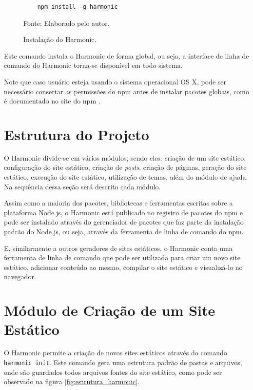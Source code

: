 \documentclass[ppginf, pep]{esinucpel}
\newcommand{\code}[1]{\texttt{#1}}
\begin{document}
\begin{figure}[H]
    \centering
    \caption{Instalação do Harmonic.}
    \vspace{5pt}
    \lstset{language=sh}
    \begin{lstlisting}
    npm install -g harmonic
    \end{lstlisting}
    Fonte: Elaborado pelo autor.
    \label{fig:install_harmonic}
\end{figure}

Este comando instala o Harmonic de forma global, ou seja, a interface de linha de comando do Harmonic torna-se disponível em todo sistema.

Note que caso usuário esteja usando o sistema operacional OS X, pode ser necessário consertar as permissões do npm antes de instalar pacotes globais, como é documentado no site do npm \cite{npm_fix_perms}.

\section{Estrutura do Projeto}

O Harmonic divide-se em vários módulos, sendo eles: criação de um site estático, configuração do site estático, criação de \textit{posts}, criação de páginas, geração do site estático, execução do site estático, utilização de temas, além do módulo de ajuda. Na sequência dessa seção será descrito cada módulo.

Assim como a maioria dos pacotes, bibliotecas e ferramentas escritas sobre a plataforma Node.js, o Harmonic está publicado no registro de pacotes do npm e pode ser instalado através do gerenciador de pacotes que faz parte da instalação padrão do Node.js, ou seja, através da ferramenta de linha de comando do npm.

E, similarmente a outros geradores de sites estáticos, o Harmonic conta uma ferramenta de linha de comando que pode ser utilizada para criar um novo site estático, adicionar conteúdo ao mesmo, compilar o site estático e visualizá-lo no navegador.

\section{Módulo de Criação de um Site Estático}

O Harmonic permite a criação de novos sites estáticos através do comando \code{harmonic init}. Este comando gera uma estrutura padrão de pastas e arquivos, onde são guardados todos arquivos fontes do site estático, como pode ser observado na figura \ref{fig:estrutura_harmonic}.
\end{document}
